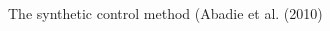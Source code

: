 \documentclass[notes,11pt, aspectratio=169]{beamer}
\begin{document}
\begin{frame}{The synthetic control method (Abadie et al. (2010)}
\begin{columns}[T]
\begin{column}{0.5\textwidth}
\end{column}
\end{columns}
\end{frame}
\end{document}
